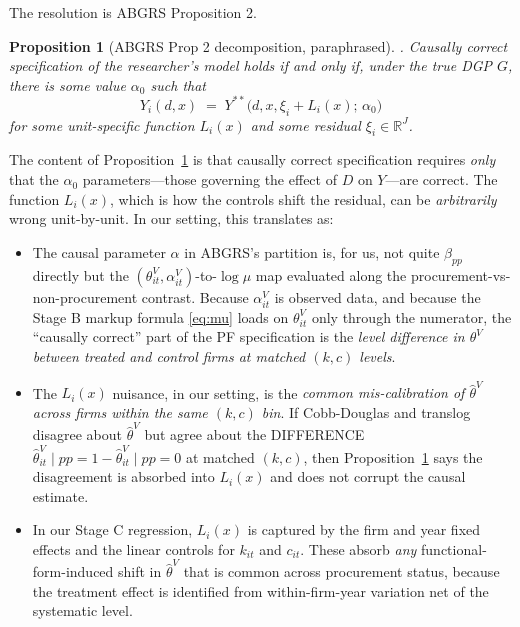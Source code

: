 \documentclass[11pt]{article}
\newtheorem{proposition}{Proposition}
\begin{document}
The resolution is ABGRS Proposition 2.

\begin{proposition}[ABGRS Prop 2 decomposition, paraphrased]\label{prop:abgrs2}
\citet[p.~1820]{ABGRS2025}. Causally correct specification of the researcher's model holds if and only if, under the true DGP $G$, there is some value $\alpha_0$ such that
\begin{equation}\label{eq:prop2}
Y_i(d,x) \;=\; Y^{**}\bigl(d,x,\xi_i + L_i(x);\,\alpha_0\bigr)
\end{equation}
for some unit-specific function $L_i(x)$ and some residual $\xi_i \in \mathbb{R}^J$.
\end{proposition}

The content of Proposition~\ref{prop:abgrs2} is that causally correct specification requires \emph{only} that the $\alpha_0$ parameters---those governing the effect of $D$ on $Y$---are correct. The function $L_i(x)$, which is how the controls shift the residual, can be \emph{arbitrarily} wrong unit-by-unit. In our setting, this translates as:

\begin{itemize}
\item The causal parameter $\alpha$ in ABGRS's partition is, for us, not quite $\beta_{pp}$ directly but the $(\theta^V_{it}, \alpha^V_{it})$-to-$\log\mu$ map evaluated along the procurement-vs-non-procurement contrast. Because $\alpha^V_{it}$ is observed data, and because the Stage B markup formula \eqref{eq:mu} loads on $\theta^V_{it}$ only through the numerator, the ``causally correct'' part of the PF specification is the \emph{level difference in $\theta^V$ between treated and control firms at matched $(k,c)$ levels}.

\item The $L_i(x)$ nuisance, in our setting, is the \emph{common mis-calibration of $\hat\theta^V$ across firms within the same $(k,c)$ bin}. If Cobb-Douglas and translog disagree about $\hat\theta^V$ but agree about the DIFFERENCE $\hat\theta^V_{it}\mid pp=1 - \hat\theta^V_{it}\mid pp=0$ at matched $(k,c)$, then Proposition~\ref{prop:abgrs2} says the disagreement is absorbed into $L_i(x)$ and does not corrupt the causal estimate.

\item In our Stage C regression, $L_i(x)$ is captured by the firm and year fixed effects and the linear controls for $k_{it}$ and $c_{it}$. These absorb \emph{any} functional-form-induced shift in $\hat\theta^V$ that is common across procurement status, because the treatment effect is identified from within-firm-year variation net of the systematic level.
\end{itemize}
\end{document}
